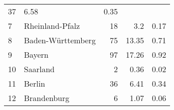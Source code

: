 \begin{longtable}{lXrrr}
       \num{37} &
       \num[round-mode=places,round-precision=2]{6,58} &
         \num[round-mode=places,round-precision=2]{0,35} \\

     7 &
     \multicolumn{1}{X}{ Rheinland-Pfalz   } &


       \num{18} &
       \num[round-mode=places,round-precision=2]{3,2} &
         \num[round-mode=places,round-precision=2]{0,17} \\

     8 &
     \multicolumn{1}{X}{ Baden-Württemberg   } &


       \num{75} &
       \num[round-mode=places,round-precision=2]{13,35} &
         \num[round-mode=places,round-precision=2]{0,71} \\

     9 &
     \multicolumn{1}{X}{ Bayern   } &


       \num{97} &
       \num[round-mode=places,round-precision=2]{17,26} &
         \num[round-mode=places,round-precision=2]{0,92} \\

     10 &
     \multicolumn{1}{X}{ Saarland   } &


       \num{2} &
       \num[round-mode=places,round-precision=2]{0,36} &
         \num[round-mode=places,round-precision=2]{0,02} \\

     11 &
     \multicolumn{1}{X}{ Berlin   } &


       \num{36} &
       \num[round-mode=places,round-precision=2]{6,41} &
         \num[round-mode=places,round-precision=2]{0,34} \\

     12 &
     \multicolumn{1}{X}{ Brandenburg   } &


       \num{6} &
       \num[round-mode=places,round-precision=2]{1,07} &
         \num[round-mode=places,round-precision=2]{0,06} \\


\end{longtable}
